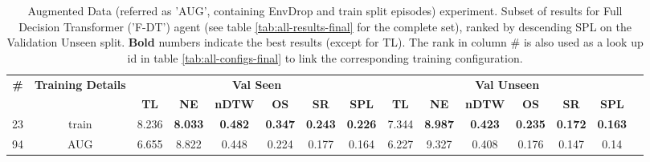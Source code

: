 \begin{table}
\centering
\caption{\label{tab:f_dt_env_drop}Augmented Data (referred as 'AUG', containing EnvDrop and train split episodes) experiment. Subset of results for Full Decision Transformer ('F-DT') agent (see table \ref{tab:all-results-final} for the complete set), ranked by descending SPL on the Validation Unseen split. \textbf{Bold} numbers indicate the best results (except for TL). The rank in column \# is also used as a look up id in table \ref{tab:all-configs-final} to link the corresponding training configuration.}
\begin{tabular}{@{\hskip3pt}c@{\hskip3pt}c@{\hskip3pt}c@{\hskip3pt}c@{\hskip3pt}c@{\hskip3pt}c@{\hskip3pt}c@{\hskip3pt}c@{\hskip3pt}c@{\hskip3pt}c@{\hskip3pt}c@{\hskip3pt}c@{\hskip3pt}c@{\hskip3pt}c@{\hskip3pt}c}
\toprule
                                  \textbf{\#} & \textbf{Training Details} & \multicolumn{6}{c}{\textbf{Val Seen}} & \multicolumn{6}{c}{\textbf{Val Unseen}} \\
\cmidrule(l){3-8}\cmidrule(l){9-14}\textbf{~} &                \textbf{~} &       \textbf{TL} &     \textbf{NE} &   \textbf{nDTW} &     \textbf{OS} &     \textbf{SR} &    \textbf{SPL} &         \textbf{TL} &     \textbf{NE} &   \textbf{nDTW} &     \textbf{OS} &     \textbf{SR} &    \textbf{SPL} \\
\midrule
                                           23 &                     train &             8.236 &  \textbf{8.033} &  \textbf{0.482} &  \textbf{0.347} &  \textbf{0.243} &  \textbf{0.226} &               7.344 &  \textbf{8.987} &  \textbf{0.423} &  \textbf{0.235} &  \textbf{0.172} &  \textbf{0.163} \\
                                           94 &                       AUG &             6.655 &           8.822 &           0.448 &           0.224 &           0.177 &           0.164 &               6.227 &           9.327 &           0.408 &           0.176 &           0.147 &            0.14 \\
\bottomrule
\end{tabular}
\end{table}
